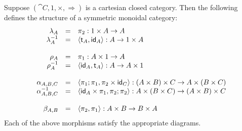 \begin{lemma}
  \label{lemma:CCC-is-SMC}
  Suppose $(\cat{C}, 1, \times, \Rightarrow)$ is a cartesian closed
  category.  Then the following defines the structure of a symmetric
  monoidal category:
  \[
  \begin{array}{rll}
    \lambda_A & = & \pi_2 : 1 \times A \rightarrow A\\
    \lambda^{-1}_A & = & \langle \mathsf{t}_A , \mathsf{id}_A  \rangle : A \rightarrow 1 \times A\\
    \\
    \rho_A & = & \pi_1 : A \times 1 \rightarrow A\\
    \rho^{-1}_A & = & \langle \mathsf{id}_A , \mathsf{t}_A  \rangle : A \rightarrow A \times 1\\
    \\
    \alpha_{A,B,C} & = & \langle \pi_1;\pi_1, \pi_2 \times \mathsf{id}_C \rangle : (A \times B) \times C \rightarrow A \times (B \times C)\\
    \alpha^{-1}_{A,B,C} & = & \langle \mathsf{id}_A \times \pi_1, \pi_2;\pi_2 \rangle : A \times (B \times C) \rightarrow (A \times B) \times C\\
    \\
    \beta_{A,B} & = & \langle \pi_2, \pi_1 \rangle : A \times B \rightarrow B \times A\\
  \end{array}
  \]
  Each of the above morphisms satisfy the appropriate diagrams.
\end{lemma}

